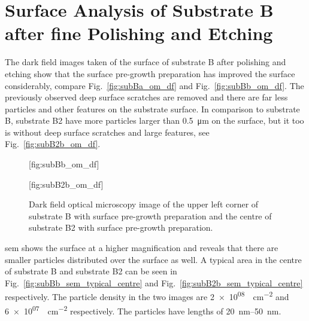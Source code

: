 \clearpage
   
   
\section{Surface Analysis of Substrate B after fine Polishing and Etching}

The dark field images taken of the surface of substrate B after polishing and etching show that the surface pre-growth preparation has improved the surface considerably, compare Fig.~\ref{fig:subBa_om_df} and Fig.~\ref{fig:subBb_om_df}. The previously observed deep surface scratches are removed and there are far less particles and other features on the substrate surface. In comparison to substrate B, substrate B2 have more particles larger than \SI{0.5}{\micro\metre} on the surface, but it too is without deep surface scratches and large features, see Fig.~\ref{fig:subB2b_om_df}.

\begin{figure}[htbp]
    \centering
    [fig:subBb_om_df]
    \par\bigskip
    [fig:subB2b_om_df]
    \caption[Dark field optical microscopy image of substrate B and B2 with surface pre-growth preparation.]{Dark field optical microscopy image of  the upper left corner of substrate B with surface pre-growth preparation and  the centre of substrate B2 with surface pre-growth preparation.}\label{fig:subBb_and_subB2b_om_df}
\end{figure}

\Ac{sem} shows the surface at a higher magnification and reveals that there are smaller particles distributed over the surface as well. A typical area in the centre of substrate B and substrate B2 can be seen in Fig.~\ref{fig:subBb_sem_typical_centre} and Fig.~\ref{fig:subB2b_sem_typical_centre} respectively. The particle density in the two images are \SI{2e+08}{\particle\centi\metre^{-2}} and \SI{6e+07}{\particle\centi\metre^{-2}} respectively. The particles have lengths of \SIrange{20}{50}{\nano\metre}. 

